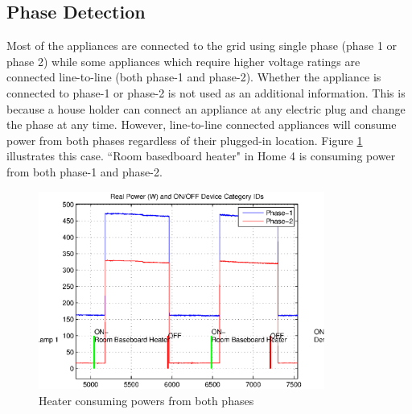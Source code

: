 \documentclass[11pt, letterpaper]{article}
\begin{document}
\subsection{Phase Detection}
Most of the appliances are connected to the grid using single phase (phase 1 or phase 2) while some appliances which require higher voltage ratings are connected line-to-line (both phase-1 and phase-2).  Whether the appliance is connected to phase-1 or phase-2 is not used as an additional information.  This is because a house holder can connect an appliance at any electric plug and change the phase at any time.  However, line-to-line connected appliances will consume power from both phases regardless of their plugged-in location.  Figure \ref{fig:heater} illustrates this case.  ``Room basedboard heater" in Home 4 is consuming power from both phase-1 and phase-2.
\begin{figure}[h]
\centering  
\includegraphics[height=6.5cm]{fig/heater.eps}
\caption{Heater consuming powers from both phases}
\label{fig:heater}
\end{figure}
\end{document}
